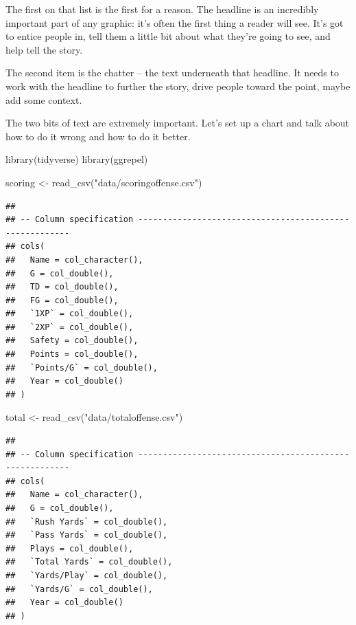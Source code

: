 \documentclass[
]{book}
\newenvironment{Shaded}{\begin{snugshade}}{\end{snugshade}}
\newcommand{\FunctionTok}[1]{\textcolor[rgb]{0.00,0.00,0.00}{#1}}
\newcommand{\NormalTok}[1]{#1}
\newcommand{\OtherTok}[1]{\textcolor[rgb]{0.56,0.35,0.01}{#1}}
\newcommand{\StringTok}[1]{\textcolor[rgb]{0.31,0.60,0.02}{#1}}
\begin{document}
The first on that list is the first for a reason. The headline is an incredibly important part of any graphic: it's often the first thing a reader will see. It's got to entice people in, tell them a little bit about what they're going to see, and help tell the story.

The second item is the chatter -- the text underneath that headline. It needs to work with the headline to further the story, drive people toward the point, maybe add some context.

The two bits of text are extremely important. Let's set up a chart and talk about how to do it wrong and how to do it better.

\begin{Shaded}
\begin{Highlighting}[]
\FunctionTok{library}\NormalTok{(tidyverse)}
\FunctionTok{library}\NormalTok{(ggrepel)}
\end{Highlighting}
\end{Shaded}

\begin{Shaded}
\begin{Highlighting}[]
\NormalTok{scoring }\OtherTok{\textless{}{-}} \FunctionTok{read\_csv}\NormalTok{(}\StringTok{"data/scoringoffense.csv"}\NormalTok{)}
\end{Highlighting}
\end{Shaded}

\begin{verbatim}
## 
## -- Column specification --------------------------------------------------------
## cols(
##   Name = col_character(),
##   G = col_double(),
##   TD = col_double(),
##   FG = col_double(),
##   `1XP` = col_double(),
##   `2XP` = col_double(),
##   Safety = col_double(),
##   Points = col_double(),
##   `Points/G` = col_double(),
##   Year = col_double()
## )
\end{verbatim}

\begin{Shaded}
\begin{Highlighting}[]
\NormalTok{total }\OtherTok{\textless{}{-}} \FunctionTok{read\_csv}\NormalTok{(}\StringTok{"data/totaloffense.csv"}\NormalTok{)}
\end{Highlighting}
\end{Shaded}

\begin{verbatim}
## 
## -- Column specification --------------------------------------------------------
## cols(
##   Name = col_character(),
##   G = col_double(),
##   `Rush Yards` = col_double(),
##   `Pass Yards` = col_double(),
##   Plays = col_double(),
##   `Total Yards` = col_double(),
##   `Yards/Play` = col_double(),
##   `Yards/G` = col_double(),
##   Year = col_double()
## )
\end{verbatim}
\end{document}
